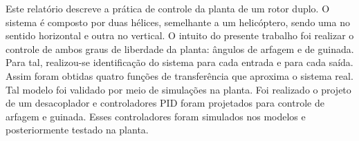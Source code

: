 Este relatório descreve a prática de controle da planta de um rotor duplo. O sistema é composto por duas hélices, semelhante a um helicóptero, sendo uma no sentido horizontal e outra no vertical. O intuito do presente trabalho foi realizar o controle de ambos graus de liberdade da planta: ângulos de arfagem e de guinada. Para tal, realizou-se identificação do sistema para cada entrada e para cada saída. Assim foram obtidas quatro funções de transferência que aproxima o sistema real. Tal modelo foi validado por meio de simulações na planta. Foi realizado o projeto de um desacoplador e controladores PID foram projetados para controle de arfagem e guinada. Esses controladores foram simulados nos modelos e posteriormente testado na planta.